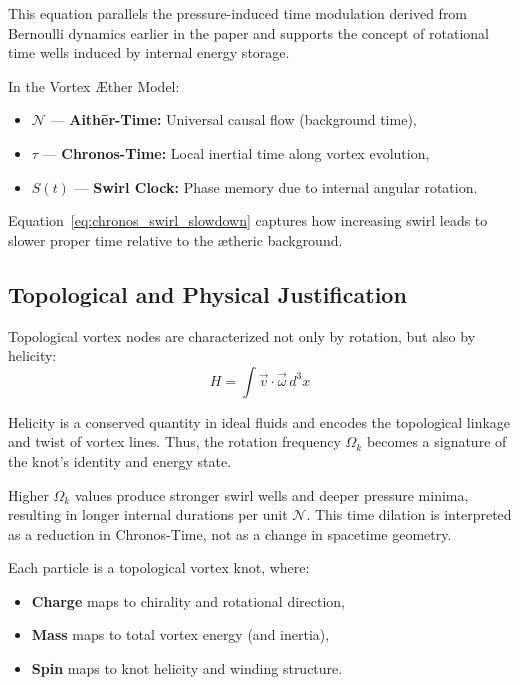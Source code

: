 \documentclass[preprint]{revtex4-2}
\begin{document}
This equation parallels the pressure-induced time modulation derived from Bernoulli dynamics earlier in the paper and supports the concept of rotational time wells induced by internal energy storage.

\begin{tcolorbox}[colback=gray!5, colframe=black!70, sharp corners=southwest, title=Temporal Mapping for Vortex Nodes]
In the Vortex Æther Model:
\begin{itemize}
    \item \( \mathcal{N} \) — \textbf{Aithēr-Time:} Universal causal flow (background time),
    \item \( \tau \) — \textbf{Chronos-Time:} Local inertial time along vortex evolution,
    \item \( S(t) \) — \textbf{Swirl Clock:} Phase memory due to internal angular rotation.
\end{itemize}
Equation~\eqref{eq:chronos_swirl_slowdown} captures how increasing swirl leads to slower proper time relative to the ætheric background.
\end{tcolorbox}

\subsection{Topological and Physical Justification}

Topological vortex nodes are characterized not only by rotation, but also by helicity:
\begin{equation}
    H = \int \vec{v} \cdot \vec{\omega} \, d^3x
\end{equation}

Helicity is a conserved quantity in ideal fluids and encodes the topological linkage and twist of vortex lines. Thus, the rotation frequency $\Omega_k$ becomes a signature of the knot’s identity and energy state.

Higher $\Omega_k$ values produce stronger swirl wells and deeper pressure minima, resulting in longer internal durations per unit $\mathcal{N}$. This time dilation is interpreted as a reduction in Chronos-Time, not as a change in spacetime geometry.

Each particle is a topological vortex knot, where:
\begin{itemize}
    \item \textbf{Charge} maps to chirality and rotational direction,
    \item \textbf{Mass} maps to total vortex energy (and inertia),
    \item \textbf{Spin} maps to knot helicity and winding structure.
\end{itemize}
\end{document}
